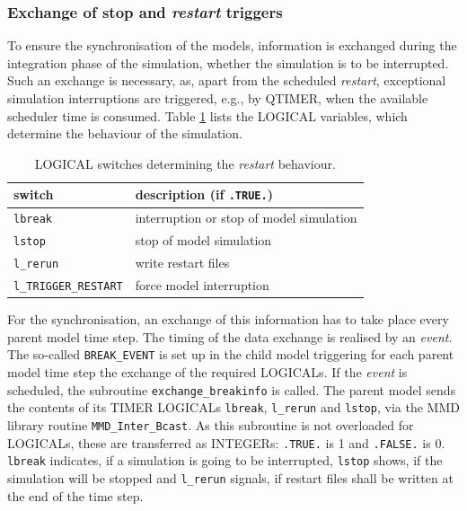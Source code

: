 \documentclass[11pt,twoside]{article}
\newcommand{\blockcode}{\ttfamily\color{OliveGreen}\par}
\begin{document}
\subsubsection{Exchange of stop and {\it restart} triggers \label{sec:restarttriggers}}
To ensure the synchronisation of the models, information is 
exchanged during the integration phase of the simulation, whether the simulation is to be interrupted. Such an exchange is 
necessary,
as, apart from the scheduled {\it restart}, exceptional simulation 
interruptions are
triggered, e.g., by QTIMER, when the available scheduler time is consumed. 
Table \ref{tab:logswitches} lists the {\footnotesize LOGICAL} variables, which
determine the behaviour of the simulation.
\begin{table} 
\begin{center}
\caption{{\footnotesize LOGICAL} switches determining the {\it restart}
 behaviour.\label{tab:logswitches}}
{\blockcode
\begin{tabular}{lp{10cm}}\hline
switch & description (if {\tt .TRUE.}) \\ \hline
{\tt lbreak} & interruption or stop of model simulation\\
{\tt lstop}  & stop of model simulation\\
{\tt l\_rerun} & write restart files \\
{\tt l\_TRIGGER\_RESTART} & force model interruption\\
\hline
\end{tabular}
}
\end{center}
\end{table}

For the synchronisation, an exchange of this information has to take place
every parent model time step. The timing of the data exchange is realised by
an {\it event}. The so-called \verb|BREAK_EVENT| is set up in the child model
triggering for each parent model time step the exchange of the required
 {\footnotesize LOGICALs}. If the {\it event} is  
scheduled, the subroutine \verb|exchange_breakinfo| is called.
The parent model sends the contents of its TIMER {\footnotesize LOGICALs} 
\verb|lbreak|, \verb|l_rerun| and \verb|lstop|, 
via the MMD library routine \verb|MMD_Inter_Bcast|. As this subroutine is not
overloaded for {\footnotesize LOGICALs}, these are transferred as 
{\footnotesize INTEGERs}:  \verb|.TRUE.| is 1 and  \verb|.FALSE.| is 0.
\verb|lbreak| indicates, if a simulation is going to be interrupted, 
\verb|lstop| shows, if the simulation will be stopped and 
\verb|l_rerun| signals, if restart files shall be written at the end of the 
time step.
\end{document}
